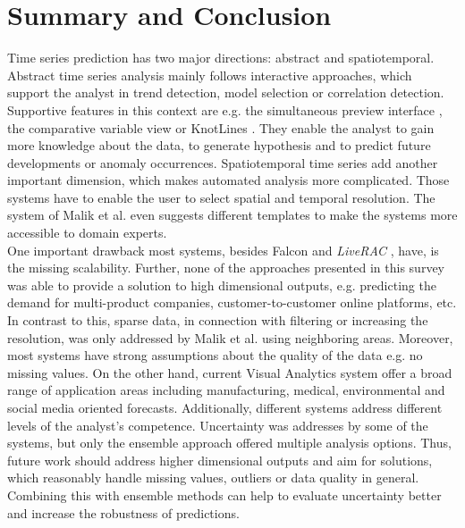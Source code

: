 \documentclass[electronic]{vgtc}             %
\begin{document}
\section{Summary and Conclusion}
Time series prediction has two major directions: abstract and spatiotemporal.
Abstract time series analysis mainly follows interactive approaches, which
support the analyst in trend detection, model selection or correlation detection. 
Supportive features in this context are e.g. the simultaneous preview interface \cite{buono:2007}, the comparative variable view \cite{steed:2017} or KnotLines \cite{Xie:2014}.
They enable the analyst to gain more knowledge about the data, to generate hypothesis and to predict future developments or anomaly occurrences.
Spatiotemporal time series add another important dimension, which makes automated analysis more complicated. 
Those systems have to enable the user to select spatial and temporal resolution.
The system of Malik et al. \cite{malik:2014} even suggests different templates to make the systems more accessible to domain experts.\\
One important drawback most systems, besides Falcon \cite{steed:2017} and \textit{LiveRAC} \cite{McLachlan:2008}, have, is the missing scalability. 
Further, none of the approaches presented in this survey was able to provide a solution to high dimensional outputs, e.g. predicting the demand for multi-product companies, customer-to-customer online platforms, etc.
In contrast to this, sparse data, in connection with filtering or increasing the resolution, was only addressed by Malik et al. \cite{malik:2014} using neighboring areas.
Moreover, most systems have strong assumptions about the quality of the data e.g. no missing values.
On the other hand, current Visual Analytics system offer a broad range of application areas including manufacturing, medical, environmental and social media oriented forecasts.
Additionally, different systems address different levels of the analyst's competence.
Uncertainty was addresses by some of the systems, but only the ensemble approach \cite{koepp:2014} offered multiple analysis options.
Thus, future work should address higher dimensional outputs and aim for solutions, which reasonably handle missing values, outliers or data quality in general.
Combining this with ensemble methods can help to evaluate uncertainty better and increase the robustness of predictions.

%
%
%

%


\end{document}
